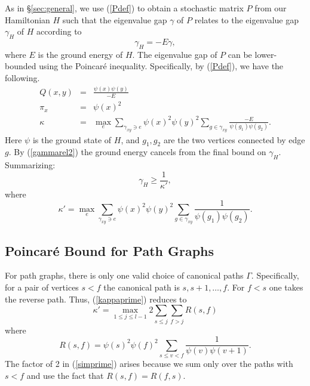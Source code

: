As in \S \ref{sec:general}, we use (\ref{Pdef}) to obtain a
stochastic matrix $P$ from our Hamiltonian $H$ such that the
eigenvalue gap $\gamma$ of $P$ relates to the eigenvalue gap
$\gamma_H$ of $H$ according to 
\begin{equation}
\label{gammarel2}
\gamma_H = -E \gamma,
\end{equation}
where $E$ is the ground energy of $H$. The eigenvalue gap of
$P$ can be lower-bounded using the Poincar\'e
inequality. Specifically, by (\ref{Pdef}), we have the following.
\begin{eqnarray}
Q(x,y) & = & \frac{\psi(x)\psi(y)}{-E} \\
\pi_x & = & \psi(x)^2 \\
\kappa & = & \max_e \sum_{\gamma_{xy} \owns e} \psi(x)^2 \psi(y)^2
\sum_{g \in \gamma_{xy}} \frac{-E}{\psi(g_1) \psi(g_2)}.
\end{eqnarray}
Here $\psi$ is the ground state of $H$, and $g_1,g_2$ are the two
vertices connected by edge $g$. By (\ref{gammarel2}) the ground energy
cancels from the final bound on  $\gamma_H$. Summarizing:
\begin{equation}
\label{gammahpoin}
\gamma_H \geq \frac{1}{\kappa'},
\end{equation}
where
\begin{equation}
\label{kappaprime}
\kappa' = \max_e \sum_{\gamma_{xy} \owns e} \psi(x)^2 \psi(y)^2
\sum_{g \in \gamma_{xy}} \frac{1}{\psi(g_1) \psi(g_2)}.
\end{equation}

\subsection{Poincar{\'e} Bound for Path Graphs}
\label{sec:poinpath}

For path graphs, there is only one valid choice of canonical paths
$\Gamma$. Specifically, for a pair of vertices $s < f$ the canonical
path is $s,s+1,\ldots,f$. For $f < s$ one takes the reverse
path. Thus, (\ref{kappaprime}) reduces to 
\begin{equation}
\label{simprime}
\kappa' = \max_{1 \leq j \leq l-1} 2 \sum_{s \leq j} \sum_{f > j}
R(s,f)
\end{equation}
where
\begin{equation}
\label{RSF}
R(s,f) = \psi(s)^2 \psi(f)^2 \sum_{s \leq v < f} \frac{1}{\psi(v) \psi(v+1)}.
\end{equation}
The factor of 2 in (\ref{simprime}) arises because we sum only over
the paths with $s < f$ and use the fact that $R(s,f) = R(f,s)$.
 
